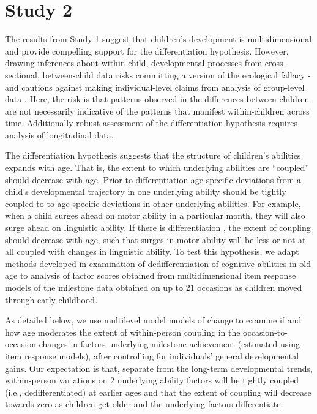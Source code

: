 \documentclass[man, floatsintext]{apa7}
\begin{document}
\section{Study 2}


The results from Study 1 suggest that children's development is multidimensional and provide compelling support for the differentiation hypothesis. However, drawing inferences about within-child, developmental processes from cross-sectional, between-child data risks committing a version of the ecological fallacy - and cautions against making individual-level claims from analysis of group-level data \parencite{piantadosi1988}. Here, the risk is that patterns observed in the differences between children are not necessarily indicative of the patterns that manifest within-children across time. Additionally robust assessment of the differentiation hypothesis requires analysis of longitudinal data.

The differentiation hypothesis suggests that the structure of children's
abilities expands with age. That is, the extent to which underlying abilities are ``coupled'' should decrease with age. Prior to differentiation age-specific deviations from a child's developmental trajectory in one underlying ability should be tightly coupled to to age-specific deviations in other underlying abilities. For example, when a child surges ahead on motor ability in a particular month, they will also surge ahead on linguistic ability. If there is differentiation , the extent of coupling should decrease with age, such that surges in motor ability will be less or not at all coupled with changes in linguistic ability. To test this hypothesis, we adapt methods developed in
examination of dedifferentiation of cognitive abilities in old age \parencite{hulur2015}
to analysis of factor scores obtained from multidimensional item
response models of the milestone data obtained on up to 21 occasions as
children moved through early childhood. 

As detailed below, we use multilevel model models of change to examine if and how age moderates
the extent of within-person coupling in the occasion-to-occasion changes
in factors underlying milestone achievement (estimated using item
response models), after controlling for individuals' general
developmental gains. Our expectation is that, separate from the
long-term developmental trends, within-person variations on 2 underlying
ability factors will be tightly coupled (i.e., dedifferentiated) at
earlier ages and that the extent of coupling will decrease towards zero
as children get older and the underlying factors differentiate.
\end{document}
